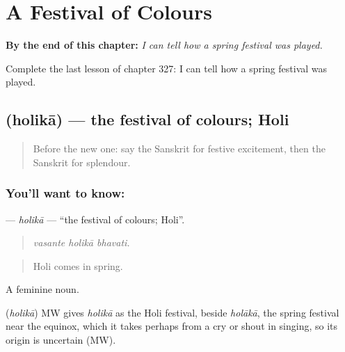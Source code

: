 
\chapter{A Festival of Colours}
\label{ch:sa-a-festival-of-colours}

\begin{chapteropening}
\textbf{By the end of this chapter:} \emph{I can tell how a spring festival was played.}

Complete the last lesson of chapter 327: I can tell how a spring festival was played.
\end{chapteropening}

\section[\texorpdfstring{\sk{होलिका} (holikā)}{होलिका (holikā)}]{ (holikā) — the festival of colours; Holi}

\label{lesson:SA-C327-holika}



\begin{quote}
Before the new one: say the Sanskrit for festive excitement, then the Sanskrit for splendour.
\end{quote}

\subsection*{You'll want to know: }
\textbf{} — \emph{holikā} — \textquotedblleft{}the festival of colours; Holi\textquotedblright{}.

\begin{quote}
  
\end{quote}

\begin{quote}
\emph{vasante holikā bhavati.}
\end{quote}

\begin{quote}
Holi comes in spring.
\end{quote}

A feminine noun.

\begin{cousinweb}
\textbf{} (\emph{holikā}) MW gives \emph{holikā} as the Holi festival, beside \emph{holākā}, the spring festival near the equinox, which it takes perhaps from a cry or shout in singing, so its origin is uncertain (MW).
\end{cousinweb}

